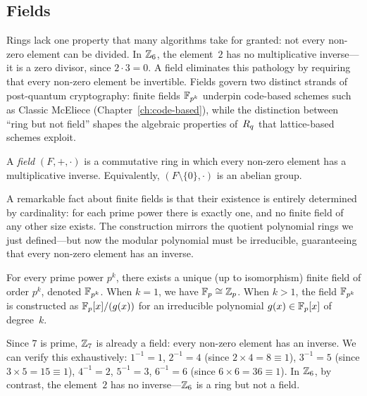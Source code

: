 \subsection{Fields}
\label{subsec:fields}

Rings lack one property that many algorithms take for granted: not every non-zero element can be divided.  In $\mathbb{Z}_6$, the element~$2$ has no multiplicative inverse---it is a zero divisor, since $2 \cdot 3 = 0$.  A field eliminates this pathology by requiring that every non-zero element be invertible.  Fields govern two distinct strands of post-quantum cryptography: finite fields $\mathbb{F}_{p^k}$ underpin code-based schemes such as Classic McEliece (Chapter~\ref{ch:code-based}), while the distinction between ``ring but not field'' shapes the algebraic properties of~$R_q$ that lattice-based schemes exploit.

\begin{definition}[Field]
\label{def:field}
A \emph{field} $(F, +, \cdot)$ is a commutative ring in which every non-zero element has a multiplicative inverse.  Equivalently, $(F\setminus\{0\}, \cdot)$ is an abelian group.
\end{definition}

A remarkable fact about finite fields is that their existence is entirely determined by cardinality: for each prime power there is exactly one, and no finite field of any other size exists.  The construction mirrors the quotient polynomial rings we just defined---but now the modular polynomial must be irreducible, guaranteeing that every non-zero element has an inverse.

\begin{theorem}
\label{thm:finite-fields}
For every prime power $p^k$, there exists a unique (up to isomorphism) finite field of order $p^k$, denoted $\mathbb{F}_{p^k}$.  When $k = 1$, we have $\mathbb{F}_p \cong \mathbb{Z}_p$.  When $k > 1$, the field $\mathbb{F}_{p^k}$ is constructed as $\mathbb{F}_p[x]/(g(x))$ for an irreducible polynomial $g(x) \in \mathbb{F}_p[x]$ of degree~$k$.
\end{theorem}

\begin{example}
\label{ex:f7}
Since $7$ is prime, $\mathbb{Z}_7$ is already a field: every non-zero element has an inverse.  We can verify this exhaustively: $1^{-1} = 1$, $2^{-1} = 4$ (since $2 \times 4 = 8 \equiv 1$), $3^{-1} = 5$ (since $3 \times 5 = 15 \equiv 1$), $4^{-1} = 2$, $5^{-1} = 3$, $6^{-1} = 6$ (since $6 \times 6 = 36 \equiv 1$).  In $\mathbb{Z}_6$, by contrast, the element~$2$ has no inverse---$\mathbb{Z}_6$ is a ring but not a field.
\end{example}

